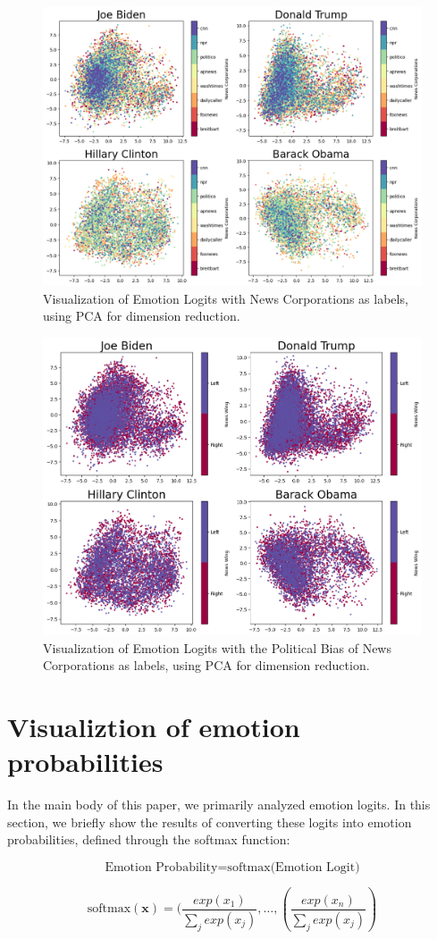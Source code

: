 \documentclass[sigconf]{acmart}
\begin{document}
\begin{figure}
\centering
\includegraphics[width=.5\textwidth]{assets/emotion_cor_pca.png}
\caption{Visualization of Emotion Logits with News Corporations as labels, using PCA for dimension reduction.}
\label{fig:emo_cors_pca}
\vspace{10pt}
\end{figure}

\begin{figure}
\centering
\includegraphics[width=.5\textwidth]{assets/emotion_bias_pca.png}
\caption{Visualization of Emotion Logits with the Political Bias of News Corporations as labels, using PCA for dimension reduction.}
\label{fig:emo_bias_pca}
\vspace{10pt}
\end{figure}



\section{Visualiztion of emotion probabilities}\label{sec:prob}
In the main body of this paper, we primarily analyzed emotion logits. In this section, we briefly show the results of converting these logits into emotion probabilities, defined through the softmax function:

\[
\text{Emotion Probability} = \text{softmax(Emotion Logit)}
\]

\[ 
\text{softmax}(\boldsymbol{x}) = (\frac{exp(x_1)}{\sum_{j} exp(x_j)}
,\dots,(\frac{exp(x_n)}{\sum_{j} exp(x_j)})
\]
\end{document}
